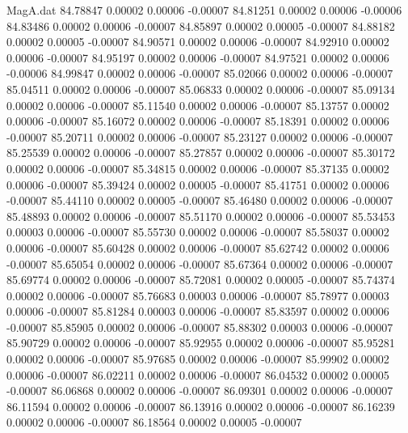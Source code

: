 \begin{filecontents}{MagA.dat}
  84.78847    0.00002    0.00006   -0.00007
  84.81251    0.00002    0.00006   -0.00006
  84.83486    0.00002    0.00006   -0.00007
  84.85897    0.00002    0.00005   -0.00007
  84.88182    0.00002    0.00005   -0.00007
  84.90571    0.00002    0.00006   -0.00007
  84.92910    0.00002    0.00006   -0.00007
  84.95197    0.00002    0.00006   -0.00007
  84.97521    0.00002    0.00006   -0.00006
  84.99847    0.00002    0.00006   -0.00007
  85.02066    0.00002    0.00006   -0.00007
  85.04511    0.00002    0.00006   -0.00007
  85.06833    0.00002    0.00006   -0.00007
  85.09134    0.00002    0.00006   -0.00007
  85.11540    0.00002    0.00006   -0.00007
  85.13757    0.00002    0.00006   -0.00007
  85.16072    0.00002    0.00006   -0.00007
  85.18391    0.00002    0.00006   -0.00007
  85.20711    0.00002    0.00006   -0.00007
  85.23127    0.00002    0.00006   -0.00007
  85.25539    0.00002    0.00006   -0.00007
  85.27857    0.00002    0.00006   -0.00007
  85.30172    0.00002    0.00006   -0.00007
  85.34815    0.00002    0.00006   -0.00007
  85.37135    0.00002    0.00006   -0.00007
  85.39424    0.00002    0.00005   -0.00007
  85.41751    0.00002    0.00006   -0.00007
  85.44110    0.00002    0.00005   -0.00007
  85.46480    0.00002    0.00006   -0.00007
  85.48893    0.00002    0.00006   -0.00007
  85.51170    0.00002    0.00006   -0.00007
  85.53453    0.00003    0.00006   -0.00007
  85.55730    0.00002    0.00006   -0.00007
  85.58037    0.00002    0.00006   -0.00007
  85.60428    0.00002    0.00006   -0.00007
  85.62742    0.00002    0.00006   -0.00007
  85.65054    0.00002    0.00006   -0.00007
  85.67364    0.00002    0.00006   -0.00007
  85.69774    0.00002    0.00006   -0.00007
  85.72081    0.00002    0.00005   -0.00007
  85.74374    0.00002    0.00006   -0.00007
  85.76683    0.00003    0.00006   -0.00007
  85.78977    0.00003    0.00006   -0.00007
  85.81284    0.00003    0.00006   -0.00007
  85.83597    0.00002    0.00006   -0.00007
  85.85905    0.00002    0.00006   -0.00007
  85.88302    0.00003    0.00006   -0.00007
  85.90729    0.00002    0.00006   -0.00007
  85.92955    0.00002    0.00006   -0.00007
  85.95281    0.00002    0.00006   -0.00007
  85.97685    0.00002    0.00006   -0.00007
  85.99902    0.00002    0.00006   -0.00007
  86.02211    0.00002    0.00006   -0.00007
  86.04532    0.00002    0.00005   -0.00007
  86.06868    0.00002    0.00006   -0.00007
  86.09301    0.00002    0.00006   -0.00007
  86.11594    0.00002    0.00006   -0.00007
  86.13916    0.00002    0.00006   -0.00007
  86.16239    0.00002    0.00006   -0.00007
  86.18564    0.00002    0.00005   -0.00007

\end{filecontents}
